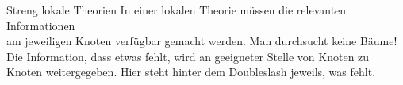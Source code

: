 \begin{frame}
  {Streng lokale Theorien}
  \onslide<+->
  \onslide<+->
  In einer lokalen Theorie müssen die relevanten Informationen\\
  \alert{am jeweiligen Knoten verfügbar gemacht werden}. Man durchsucht keine Bäume!\\
  \onslide<+->
  \Viertelzeile
  Die Information, dass etwas fehlt, wird an geeigneter Stelle \alert{von Knoten zu Knoten weitergegeben}. Hier steht hinter dem \alert{Doubleslash} jeweils, was fehlt.\\
  \centering 
  \onslide<+->
  \Halbzeile
  \centering
    \onslide<+->\hspace{3em}
\end{frame}

